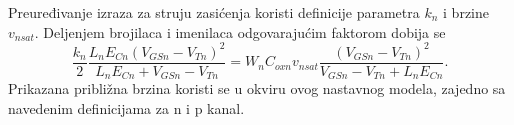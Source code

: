 Preuređivanje izraza za struju zasićenja koristi definicije parametra $k_n$ i brzine $v_{nsat}$. Deljenjem brojilaca i imenilaca odgovarajućim faktorom dobija se
\[\frac{k_n}{2}\frac{L_nE_{Cn}(V_{GSn}-V_{Tn})^2}{L_nE_{Cn}+V_{GSn}-V_{Tn}}=W_nC_{oxn}v_{nsat}\frac{(V_{GSn}-V_{Tn})^2}{V_{GSn}-V_{Tn}+L_nE_{Cn}}.\]
Prikazana približna brzina koristi se u okviru ovog nastavnog modela, zajedno sa navedenim definicijama za n i p kanal.
